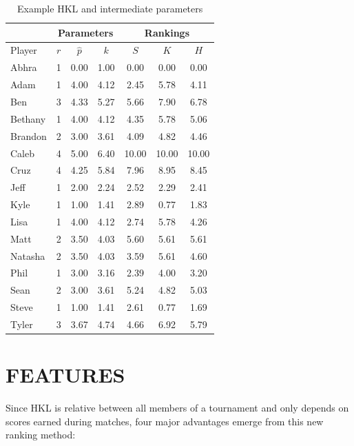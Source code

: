 \documentclass[letterpaper, 10 pt, conference]{ieeeconf}  %
\begin{document}
\begin{table}[hb]
        \begin{tabular}{lccc|ccc}
                \toprule
                &\multicolumn{3}{c}{Parameters} & \multicolumn{3}{c}{Rankings}\\
                \midrule
                Player  & $r$   & $\hat{p}$ & $k$ & $S$ & $K$   & $H$ \\
                \midrule
                Abhra	& 1	& 0.00	& 1.00	& 0.00	& 0.00	& 0.00 \\
                Adam	& 1	& 4.00	& 4.12	& 2.45	& 5.78	& 4.11 \\
                Ben	& 3	& 4.33	& 5.27	& 5.66	& 7.90	& 6.78 \\
                Bethany	& 1	& 4.00	& 4.12	& 4.35	& 5.78	& 5.06 \\
                Brandon	& 2	& 3.00	& 3.61	& 4.09	& 4.82	& 4.46 \\
                Caleb	& 4	& 5.00	& 6.40	& 10.00	& 10.00	& 10.00 \\
                Cruz	& 4	& 4.25	& 5.84	& 7.96	& 8.95	& 8.45 \\
                Jeff	& 1	& 2.00	& 2.24	& 2.52	& 2.29	& 2.41 \\
                Kyle	& 1	& 1.00	& 1.41	& 2.89	& 0.77	& 1.83 \\
                Lisa	& 1	& 4.00	& 4.12	& 2.74	& 5.78	& 4.26 \\
                Matt	& 2	& 3.50	& 4.03	& 5.60	& 5.61	& 5.61 \\
                Natasha	& 2	& 3.50	& 4.03	& 3.59	& 5.61	& 4.60 \\
                Phil	& 1	& 3.00	& 3.16	& 2.39	& 4.00	& 3.20 \\
                Sean	& 2	& 3.00	& 3.61	& 5.24	& 4.82	& 5.03 \\
                Steve	& 1	& 1.00	& 1.41	& 2.61	& 0.77	& 1.69 \\
                Tyler	& 3	& 3.67	& 4.74	& 4.66	& 6.92	& 5.79 \\
                \bottomrule
        \end{tabular}
        \centering
        \caption{Example HKL and intermediate parameters}
        \label{tab:example-ratings}
\end{table}

\section{FEATURES}
Since HKL is relative between all members of a tournament and only depends on 
scores earned during matches, four major advantages emerge from this new ranking
method:
\end{document}

